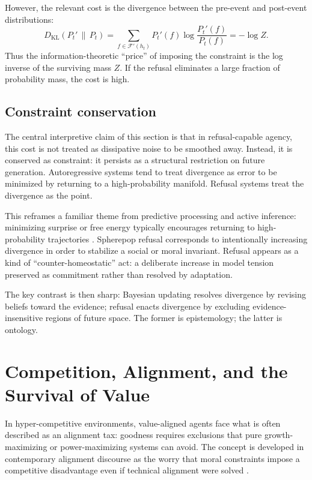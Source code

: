 \documentclass[11pt]{article}
\newcommand{\Future}{\mathcal{F}}
\begin{document}
However, the relevant cost is the divergence between the pre-event and
post-event distributions:
\[
D_{\mathrm{KL}}(P_t' \,\|\, P_t) = \sum_{f\in \Future'(h_t)} P_t'(f)\log \frac{P_t'(f)}{P_t(f)}
= -\log Z.
\]
Thus the information-theoretic ``price'' of imposing the constraint is the log
inverse of the surviving mass $Z$. If the refusal eliminates a large fraction
of probability mass, the cost is high.

\subsection{Constraint conservation}

The central interpretive claim of this section is that in refusal-capable
agency, this cost is not treated as dissipative noise to be smoothed away.
Instead, it is conserved as constraint: it persists as a structural restriction
on future generation. Autoregressive systems tend to treat divergence as error
to be minimized by returning to a high-probability manifold. Refusal systems
treat the divergence as the point.

This reframes a familiar theme from predictive processing and active inference:
minimizing surprise or free energy typically encourages returning to
high-probability trajectories \cite{friston2010freeenergy,clark2016surfing}.
Spherepop refusal corresponds to intentionally increasing divergence in order to
stabilize a social or moral invariant. Refusal appears as a kind of
``counter-homeostatic'' act: a deliberate increase in model tension preserved as
commitment rather than resolved by adaptation.

The key contrast is then sharp: Bayesian updating resolves divergence by
revising beliefs toward the evidence; refusal enacts divergence by excluding
evidence-insensitive regions of future space. The former is epistemology; the
latter is ontology.

\section{Competition, Alignment, and the Survival of Value}
\label{sec:competition}

In hyper-competitive environments, value-aligned agents face what is often
described as an alignment tax: goodness requires exclusions that pure
growth-maximizing or power-maximizing systems can avoid. The concept is developed
in contemporary alignment discourse as the worry that moral constraints impose a
competitive disadvantage even if technical alignment were solved
\cite{carlsmith2025goodness}.
\end{document}
